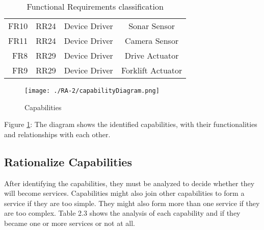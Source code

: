 \begin{table}
\begin{tabular}{| r | p{2cm} | c | c |}
		\hline
		FR10 & RR24 & Device Driver & Sonar Sensor\\
		FR11 & RR24 & Device Driver & Camera Sensor\\
		FR8 & RR29 & Device Driver & Drive Actuator\\
		FR9 & RR29 & Device Driver & Forklift Actuator\\
	 	\hline
	\end{tabular}
	\caption{Functional Requirements classification}
\end{table}


\begin{figure}[ht!]
 \centering
 \texttt{[image: ./RA-2/capabilityDiagram.png]}
 \caption{Capabilities}
 \label{fig:capabilities}
\end{figure}

Figure \ref{fig:capabilities}: The diagram shows the identified capabilities, with their functionalities and relationships with each other.

\subsection{Rationalize Capabilities}
After identifying the capabilities, they must be analyzed to decide whether they will become services. Capabilities might also join other capabilities to form a service if they are too simple. They might also form more than one service if they are too complex. Table 2.3 shows the analysis of each capability and if they became one or more services or not at all.

